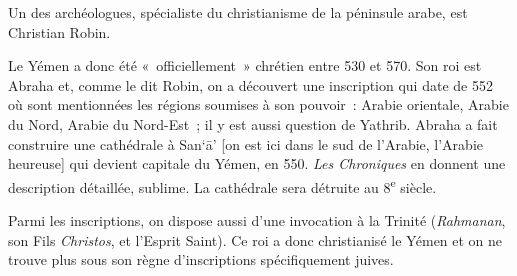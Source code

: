 
Un des archéologues, spécialiste du christianisme de la péninsule arabe,
est Christian Robin.


Le Yémen a donc été «~officiellement~» chrétien entre 530 et 570. Son
roi est Abraha et, comme le dit Robin, on a découvert une inscription
qui date de 552 où sont mentionnées les régions soumises à son pouvoir~:
Arabie orientale, Arabie du Nord, Arabie du Nord-Est~; il y est aussi
question de Yathrib. Abraha a fait construire une cathédrale à San`ā'
{[}on est ici dans le sud de l'Arabie, l'Arabie heureuse{]} qui devient
capitale du Yémen, en 550. \emph{Les Chroniques} en donnent une
description détaillée, sublime. La cathédrale sera détruite au
8\textsuperscript{e} siècle.

Parmi les inscriptions, on dispose aussi d'une invocation à la Trinité
(\emph{Rahmanan}, son Fils \emph{Christos}, et l'Esprit Saint). Ce roi a
donc christianisé le Yémen et on ne trouve plus sous son règne
d'inscriptions spécifiquement juives.


